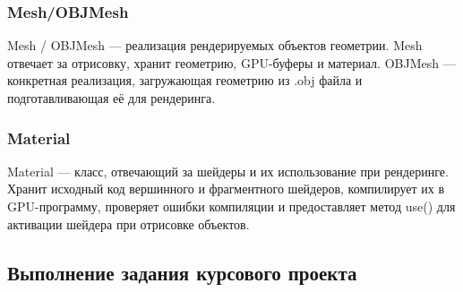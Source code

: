 \documentclass[a4paper,12pt]{article}
\begin{document}
\subsubsection*{Mesh/OBJMesh}
Mesh / OBJMesh — реализация рендерируемых объектов геометрии.
Mesh отвечает за отрисовку, хранит геометрию, GPU-буферы и материал.
OBJMesh — конкретная реализация, загружающая геометрию из .obj файла и подготавливающая её для рендеринга.

\subsubsection*{Material}
Material — класс, отвечающий за шейдеры и их использование при рендеринге. Хранит исходный код вершинного и фрагментного шейдеров, компилирует их в GPU-программу, проверяет ошибки компиляции и предоставляет метод use() для активации шейдера при отрисовке объектов.

\subsection{Выполнение задания курсового проекта}
% 
\end{document}
